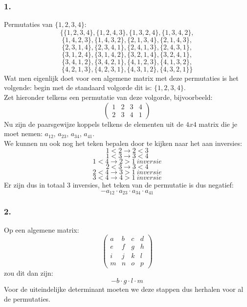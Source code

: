 \documentclass[lineaire_algebra_oplossingen.tex]{subfiles}
\begin{document}
\subsubsection*{1.}
Permutaties van $\{1,2,3,4\}$:
$$
\{\{1, 2, 3, 4\}, \{1, 2, 4, 3\}, \{1, 3, 2, 4\}, \{1, 3, 4, 2\},$$
$$ \{1, 4, 2, 3\}, \{1, 4, 3, 2\}, \{2, 1, 3, 4\}, \{2, 1, 4, 3\}, $$ 
$$\{2, 3, 1, 4\}, \{2, 3, 4, 1\}, \{2, 4, 1, 3\}, \{2, 4, 3, 1\}, $$
$$\{3, 1, 2, 4\}, \{3, 1, 4, 2\}, \{3, 2, 1, 4\}, \{3, 2, 4, 1\}, $$ $$
\{3, 4, 1, 2\}, \{3, 4, 2, 1\}, \{4, 1, 2, 3\}, \{4, 1, 3, 2\}, $$
$$\{4, 2, 1, 3\}, \{4, 2, 3, 1\}, \{4, 3, 1, 2\}, \{4, 3, 2, 1\}\}
$$
Wat men eigenlijk doet voor een algemene matrix met deze permutaties is het volgende: begin met de standaard volgorde dit is: $\{1,2,3,4\}$.\\ Zet hieronder telkens een permutatie van deze volgorde, bijvoorbeeld:
$$\begin{pmatrix}
1 & 2 & 3 & 4\\
2 & 3 & 4 & 1
\end{pmatrix}
$$
Nu zijn de paarsgewijze koppels telkens de elementen uit de $4x4$ matrix die je moet nemen: $a_{12}$, $a_{23}$, $a_{34}$, $a_{41}$.\\
We kunnen nu ook nog het teken bepalen door te kijken naar het aan inversies:\\
$$1 < 2 \rightarrow 2 < 3$$
$$1 < 3 \rightarrow 3 < 4$$
$$1 < 4 \rightarrow 2 > 1 \ inversie$$
$$2 < 3 \rightarrow 3 < 4$$
$$2 < 4 \rightarrow 3 > 1 \ inversie$$
$$3 < 4 \rightarrow 4 > 1 \ inversie$$
Er zijn dus in totaal 3 inversies, het teken van de permutatie is dus negatief:
$$-a_{12}\cdot a_{23}\cdot a_{34}\cdot a_{41}$$
\subsubsection*{2.}
Op een algemene matrix:
$$
\begin{pmatrix}
a & b & c & d\\
e & f & g & h\\
i & j & k & l\\
m & n & o & p
\end{pmatrix}
$$
zou dit dan zijn:
$$-b\cdot g\cdot l\cdot m$$
Voor de uiteindelijke determinant moeten we deze stappen dus herhalen voor al de permutaties.
\end{document}
